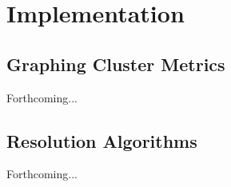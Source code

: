 \chapter{Implementation}\label{chap:implementation}
\section{Graphing Cluster Metrics}
Forthcoming...
\section{Resolution Algorithms}
Forthcoming...